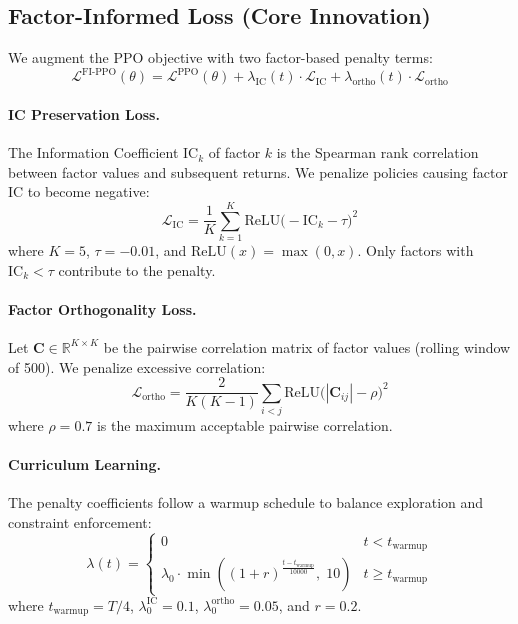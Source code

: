 \documentclass[11pt,a4paper]{article}
\begin{document}
\subsection{Factor-Informed Loss (Core Innovation)}
\label{sec:fi_loss}

We augment the PPO objective with two factor-based penalty terms:
\begin{equation}
    \mathcal{L}^{\text{FI-PPO}}(\theta) = \mathcal{L}^{\text{PPO}}(\theta) + \lambda_{\text{IC}}(t) \cdot \mathcal{L}_{\text{IC}} + \lambda_{\text{ortho}}(t) \cdot \mathcal{L}_{\text{ortho}}
    \label{eq:fi_ppo}
\end{equation}

\paragraph{IC Preservation Loss.}
The Information Coefficient $\text{IC}_k$ of factor $k$ is the Spearman rank correlation between factor values and subsequent returns. We penalize policies causing factor IC to become negative:
\begin{equation}
    \mathcal{L}_{\text{IC}} = \frac{1}{K}\sum_{k=1}^{K} \text{ReLU}\big(-\text{IC}_k - \tau\big)^2
    \label{eq:ic_loss}
\end{equation}
where $K=5$, $\tau = -0.01$, and $\text{ReLU}(x) = \max(0,x)$. Only factors with $\text{IC}_k < \tau$ contribute to the penalty.

\paragraph{Factor Orthogonality Loss.}
Let $\mathbf{C} \in \mathbb{R}^{K \times K}$ be the pairwise correlation matrix of factor values (rolling window of 500). We penalize excessive correlation:
\begin{equation}
    \mathcal{L}_{\text{ortho}} = \frac{2}{K(K-1)}\sum_{i < j} \text{ReLU}\big(|\mathbf{C}_{ij}| - \rho\big)^2
    \label{eq:ortho_loss}
\end{equation}
where $\rho = 0.7$ is the maximum acceptable pairwise correlation.

\paragraph{Curriculum Learning.}
The penalty coefficients follow a warmup schedule to balance exploration and constraint enforcement:
\begin{equation}
    \lambda(t) = \begin{cases}
        0 & t < t_{\text{warmup}} \\
        \lambda_0 \cdot \min\!\left((1 + r)^{\frac{t - t_{\text{warmup}}}{10000}},\; 10\right) & t \geq t_{\text{warmup}}
    \end{cases}
    \label{eq:curriculum}
\end{equation}
where $t_{\text{warmup}} = T/4$, $\lambda_0^{\text{IC}} = 0.1$, $\lambda_0^{\text{ortho}} = 0.05$, and $r = 0.2$.
\end{document}
